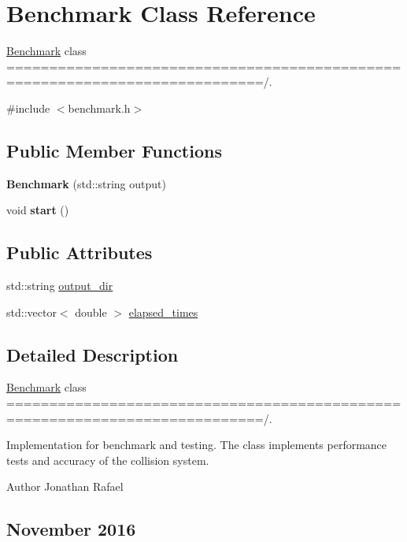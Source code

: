 \hypertarget{class_benchmark}{}\section{Benchmark Class Reference}
\label{class_benchmark}


\hyperlink{class_benchmark}{Benchmark} class ============================================================================/.  




{\ttfamily \#include $<$benchmark.\+h$>$}

\subsection*{Public Member Functions}
\begin{DoxyCompactItemize}
\item 
\mbox{\label{class_benchmark_a6c334912b79502e5a344c1ba512d87c6}} 
{\bfseries Benchmark} (std\+::string output)
\item 
\mbox{\label{class_benchmark_a7b4af5d507d31572b3648bb09de9b78b}} 
void {\bfseries start} ()
\end{DoxyCompactItemize}
\subsection*{Public Attributes}
\begin{DoxyCompactItemize}
\item 
std\+::string \hyperlink{class_benchmark_a5cea4a90c86a242be2e8583054bf8b1c}{output\+\_\+dir}
\item 
std\+::vector$<$ double $>$ \hyperlink{class_benchmark_aad25ea73aeb6800ef6a65a516559cb86}{elapsed\+\_\+times}
\end{DoxyCompactItemize}


\subsection{Detailed Description}
\hyperlink{class_benchmark}{Benchmark} class ============================================================================/. 

Implementation for benchmark and testing. The class implements performance tests and accuracy of the collision system. \begin{DoxyAuthor}{Author}
Jonathan Rafael \subsection*{November 2016 }
\end{DoxyAuthor}


